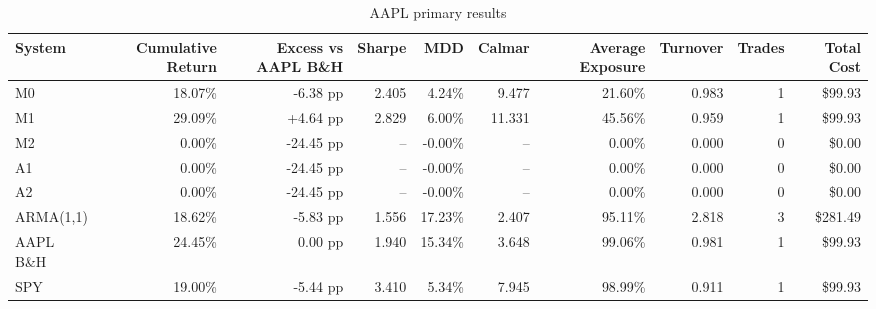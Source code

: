 \begin{table}[htbp]
\centering
\small
\caption{AAPL primary results}
\label{tab:aapl-primary}
\begin{tabular}{lrrrrrrrrr}
\toprule
System & Cumulative Return & Excess vs AAPL B\&H & Sharpe & MDD & Calmar & Average Exposure & Turnover & Trades & Total Cost \\
\midrule
M0 & 18.07\% & -6.38 pp & 2.405 & 4.24\% & 9.477 & 21.60\% & 0.983 & 1 & \$99.93 \\
M1 & 29.09\% & +4.64 pp & 2.829 & 6.00\% & 11.331 & 45.56\% & 0.959 & 1 & \$99.93 \\
M2 & 0.00\% & -24.45 pp & -- & -0.00\% & -- & 0.00\% & 0.000 & 0 & \$0.00 \\
A1 & 0.00\% & -24.45 pp & -- & -0.00\% & -- & 0.00\% & 0.000 & 0 & \$0.00 \\
A2 & 0.00\% & -24.45 pp & -- & -0.00\% & -- & 0.00\% & 0.000 & 0 & \$0.00 \\
ARMA(1,1) & 18.62\% & -5.83 pp & 1.556 & 17.23\% & 2.407 & 95.11\% & 2.818 & 3 & \$281.49 \\
AAPL B\&H & 24.45\% & 0.00 pp & 1.940 & 15.34\% & 3.648 & 99.06\% & 0.981 & 1 & \$99.93 \\
SPY & 19.00\% & -5.44 pp & 3.410 & 5.34\% & 7.945 & 98.99\% & 0.911 & 1 & \$99.93 \\
\bottomrule
\end{tabular}
\end{table}
